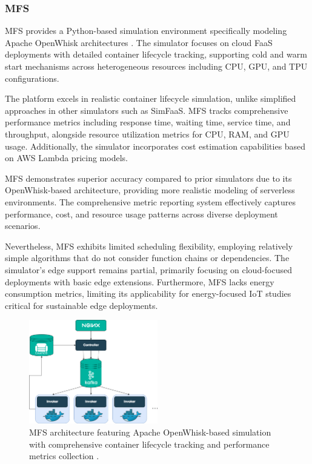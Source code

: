 \subsubsection{MFS}

MFS provides a Python-based simulation environment specifically modeling Apache OpenWhisk architectures \cite{bermbach2019mfs}. The simulator focuses on cloud FaaS deployments with detailed container lifecycle tracking, supporting cold and warm start mechanisms across heterogeneous resources including CPU, GPU, and TPU configurations.

The platform excels in realistic container lifecycle simulation, unlike simplified approaches in other simulators such as SimFaaS. MFS tracks comprehensive performance metrics including response time, waiting time, service time, and throughput, alongside resource utilization metrics for CPU, RAM, and GPU usage. Additionally, the simulator incorporates cost estimation capabilities based on AWS Lambda pricing models.

MFS demonstrates superior accuracy compared to prior simulators due to its OpenWhisk-based architecture, providing more realistic modeling of serverless environments. The comprehensive metric reporting system effectively captures performance, cost, and resource usage patterns across diverse deployment scenarios.

Nevertheless, MFS exhibits limited scheduling flexibility, employing relatively simple algorithms that do not consider function chains or dependencies. The simulator's edge support remains partial, primarily focusing on cloud-focused deployments with basic edge extensions. Furthermore, MFS lacks energy consumption metrics, limiting its applicability for energy-focused IoT studies critical for sustainable edge deployments.

\begin{figure}[htbp]
\centering
\includegraphics[width=0.5\textwidth]{assets/Apache OpenWhisk architecture.png}
\caption{MFS architecture featuring Apache OpenWhisk-based simulation with comprehensive container lifecycle tracking and performance metrics collection \cite{bermbach2019mfs, banaei2022etas}.}
\label{fig:mfs-architecture}
\end{figure}

